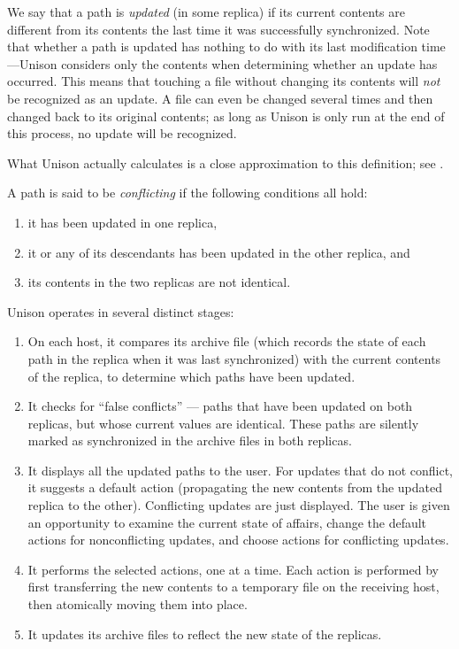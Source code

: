 \documentclass{article}
\begin{document}
We say that a path is {\em updated} (in some replica) if its current
contents are different from its contents the last time it was successfully
synchronized.  Note that whether a path is updated has nothing to do with
its last modification time---Unison considers only the contents when
determining whether an update has occurred.  This means that touching a file
without changing its contents will {\em not} be recognized as an update.  A
file can even be changed several times and then changed back to its original
contents; as long as Unison is only run at the end of this process, no
update will be recognized.

What Unison actually calculates is a close approximation to this
definition; see .


A path is said to be {\em conflicting} if the following conditions all hold:
\begin{enumerate}
\item it has been updated in one replica,
\item it or any of its descendants has been updated in the other
  replica,
and
\item its contents in the two replicas are not identical.
\end{enumerate}




Unison operates in several distinct stages:
\begin{enumerate}
\item On each host, it compares its archive file (which records
the state of each path in the replica when it was last synchronized)
with the current contents of the replica, to determine which paths
have been updated.
\item It checks for ``false conflicts'' --- paths that have been
updated on both replicas, but whose current values are identical.
These paths are silently marked as synchronized in the archive files
in both replicas.
\item It displays all the updated paths to the user.  For updates that
do not conflict, it suggests a default action (propagating the new
contents from the updated replica to the other).  Conflicting updates
are just displayed.  The user is given an opportunity to examine the
current state of affairs, change the default actions for
nonconflicting updates, and choose actions for conflicting updates.
\item It performs the selected actions, one at a time.  Each action is
performed by first transferring the new contents to a temporary file
on the receiving host, then atomically moving them into place.
\item It updates its archive files to reflect the new state of the
replicas.
\end{enumerate}
\end{document}
